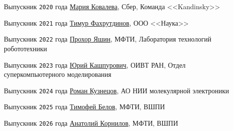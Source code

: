 \documentclass[a4paper,12pt]{article}
\renewenvironment{itemize}
{
    \begin{list}{\labelitemi}
    {
      \setlength{\topsep}{0pt}
      \setlength{\partopsep}{0pt}
      \setlength{\parskip}{0pt}
      \setlength{\itemsep}{0pt}
      \setlength{\parsep}{0pt}
      \setlength{\leftmargin}{14.5pt}
    }
}{\end{list}}
\begin{document}
\begin{itemize}

    \item Выпускник \texttt{2020} года \href{https://t.me/makovka2000}{Мария Ковалева}, Сбер, Команда <<Kandinsky>>

    \smallskip

    \item Выпускник \texttt{2021} года \href{https://t.me/TF0801}{Тимур Фахрутдинов}, ООО <<Наука>>

    \smallskip

    \item Выпускник \texttt{2022} года \href{https://t.me/Funny_ded}{Прохор Яшин}, МФТИ, Лаборатория технологий робототехники

    \smallskip

    \item Выпускник \texttt{2023} года \href{https://t.me/YuriKashpur}{Юрий Кашпурович}, ОИВТ РАН, Отдел суперкомпьютерного моделирования

    \smallskip

    \item Выпускник \texttt{2024} года \href{https://t.me/Yeah_That_Fits}{Роман Кузнецов}, АО НИИ молекулярной электроники

    \smallskip

    \item Выпускник \texttt{2025} года \href{https://t.me/Tefaier}{Тимофей Белов}, МФТИ, ВШПИ

    \smallskip

    \item Выпускник \texttt{2026} года \href{https://t.me/knot_of_a_linkin_korn}{Анатолий Корнилов}, МФТИ, ВШПИ

\end{itemize}
\end{document}
